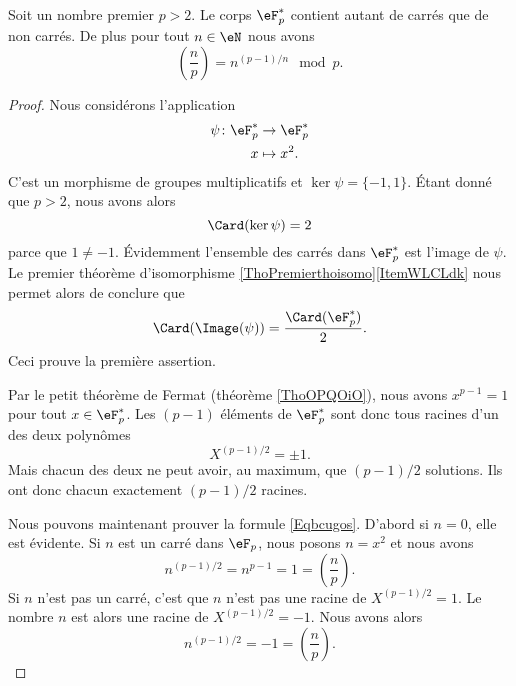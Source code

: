 \begin{proposition} \label{PropcGsJjk}
    Soit un nombre premier \( p>2\). Le corps \( \eF_p^*\) contient autant de carrés que de non carrés. De plus pour tout \( n\in \eN\) nous avons
    \begin{equation}    \label{Eqbcugos}
        \left(\frac{n}{p}\right)=n^{(p-1)/n}\mod p.
    \end{equation}
\end{proposition}

\begin{proof}
    Nous considérons l'application 
    \begin{equation}
        \begin{aligned}
            \psi\colon \eF^*_p&\to \eF^*_p \\
            x&\mapsto x^2. 
        \end{aligned}
    \end{equation}
    C'est un morphisme de groupes multiplicatifs et \( \ker\psi=\{ -1,1 \}\). Étant donné que \( p>2\), nous avons alors
    \begin{equation}
        \Card(\ker\psi)=2
    \end{equation}
    parce que \( 1\neq -1\). Évidemment l'ensemble des carrés dans \( \eF^*_p\) est l'image de \( \psi\). Le premier théorème d'isomorphisme \ref{ThoPremierthoisomo}\ref{ItemWLCLdk} nous permet alors de conclure que
    \begin{equation}
        \Card(\Image(\psi))=\frac{ \Card(\eF^*_p) }{2}.
    \end{equation}
    Ceci prouve la première assertion.

    Par le petit théorème de Fermat (théorème \ref{ThoOPQOiO}), nous avons \( x^{p-1}=1\) pour tout \( x\in \eF^*_p\). Les \( (p-1)\) éléments de \( \eF^*_p\) sont donc tous racines d'un des deux polynômes
    \begin{equation}
        X^{(p-1)/2}=\pm 1.
    \end{equation}
    Mais chacun des deux ne peut avoir, au maximum, que \( (p-1)/2\) solutions. Ils ont donc chacun exactement \( (p-1)/2\) racines.

    Nous pouvons maintenant prouver la formule \eqref{Eqbcugos}. D'abord si \( n=0\), elle est évidente. Si \( n\) est un carré dans \( \eF_p\), nous posons \( n=x^2\) et nous avons
    \begin{equation}
        n^{(p-1)/2}=n^{p-1}=1=\left(\frac{n}{p}\right).
    \end{equation}
    Si \( n\) n'est pas un carré, c'est que \( n\) n'est pas une racine de \( X^{(p-1)/2}=1\). Le nombre \( n\) est alors une racine de \( X^{(p-1)/2}=-1\). Nous avons alors
    \begin{equation}
        n^{(p-1)/2}=-1=\left(\frac{n}{p}\right).
    \end{equation}
\end{proof}

